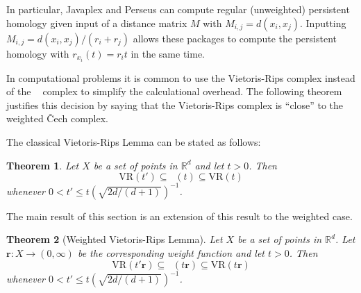\documentclass{amsart}
\newtheorem{theorem}{Theorem}[section]
\newtheorem*{fibering lemma}{Fibering Lemma}
\newtheorem*{decomposition lemma}{Decomposition Lemma}
\newtheorem*{hurewicz theorem}{Hurewicz Theorem}
\theoremstyle{definition}
\newcommand{\RR}{\mathbb{R}}
\newcommand{\VR}{\mathrm{VR}}
\DeclareMathOperator{\Cech}{\check{C}ech}
\begin{document}
In particular, Javaplex and Perseus can compute regular (unweighted) persistent homology given input of a distance matrix $M$ with $M_{i,j}=d(x_i,x_j)$. Inputting $M_{i,j}=d(x_i,x_j)/(r_i+r_j)$ allows these packages to compute the persistent homology with $r_{x_i}(t)=r_it$ in the same time.

In computational problems it is common to use the Vietoris-Rips complex instead of the $\Cech$ complex to simplify the calculational overhead. The following theorem justifies this decision by saying that the Vietoris-Rips complex is ``close'' to the weighted \v{C}ech complex. 

The classical Vietoris-Rips Lemma can be stated as follows:
\begin{theorem}\cite{dSG-2007}
Let $X$ be a set of points in $\mathbb{R}^d$ and let $t > 0$.  Then \[\VR(t') \subseteq \Cech(t) \subseteq \VR(t)\] whenever $0< t' \le t \left(\sqrt{2d/(d+1)}\right)^{-1}$.
\end{theorem}

The main result of this section is an extension of this result to the weighted case.  

\begin{theorem}[Weighted Vietoris-Rips Lemma] \label{thm:multiscale-rips} Let $X$ be a set of points in $\RR^d$.  Let $\mathbf{r}: X \to (0,\infty)$ be the corresponding weight function and let $t >0$. Then \[\VR(t'\mathbf{r}) \subseteq \Cech(t \mathbf{r}) \subseteq \VR(t \mathbf{r})\] whenever $0< t' \le t \left(\sqrt{2d/(d+1)}\right)^{-1}$.
\end{theorem}
\end{document}
